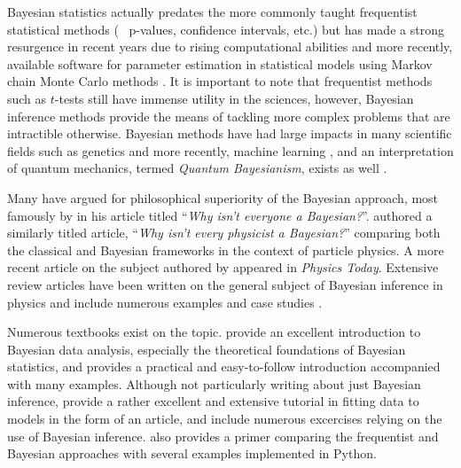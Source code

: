 Bayesian statistics actually predates the more commonly taught frequentist statistical methods (\eg~ p-values, confidence intervals, etc.) but has made a strong resurgence in recent years due to rising computational abilities and more recently, available software for parameter estimation in statistical models using Markov chain Monte Carlo methods \citep{Brooks03}. It is important to note that frequentist methods such as $t$-tests still have immense utility in the sciences, however, Bayesian inference methods provide the means of tackling more complex problems that are intractible otherwise. Bayesian methods have had large impacts in many scientific fields such as genetics \citep{Beaumont04} and more recently, machine learning \citep{Murphy12}, and an interpretation of quantum mechanics, termed \emph{Quantum Bayesianism}, exists as well \citep{Timpson08}. 

Many have argued for philosophical superiority of the Bayesian approach, most famously by \citet{Efron86} in his article titled ``\textit{Why isn't everyone a Bayesian?}''. \citet{Cousins95} authored a similarly titled article, ``\textit{Why isn't every physicist a Bayesian?}'' comparing both the classical and Bayesian frameworks in the context of particle physics. A more recent article on the subject authored by \citet{Lyons12} appeared in \emph{Physics Today}. Extensive review articles have been written on the general subject of Bayesian inference in physics and include numerous examples and case studies \citet{vonToussaint11,Dose03,Dagostini03}.

Numerous textbooks exist on the topic. \citet{Gelman14} provide an excellent introduction to Bayesian data analysis, especially the theoretical foundations of Bayesian statistics, and \citet{Kruschke14} provides a practical and easy-to-follow introduction accompanied with many examples. Although not particularly writing about just Bayesian inference, \citet{Hogg10} provide a rather excellent and extensive tutorial in fitting data to models in the form of an article, and include numerous excercises relying on the use of Bayesian inference. \citet{vanderPlas14} also provides a primer comparing the frequentist and Bayesian approaches with several examples implemented in Python.


